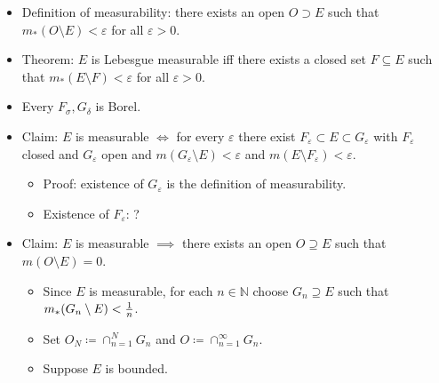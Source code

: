 
\begin{solution}

\hfill

\begin{concept}

\hfill

\begin{itemize}
\tightlist
\item
  Definition of measurability: there exists an open \(O\supset E\) such
  that \(m_*(O\setminus E) < \varepsilon\) for all \(\varepsilon> 0\).
\item
  Theorem: \(E\) is Lebesgue measurable iff there exists a closed set
  \(F\subseteq E\) such that \(m_*(E\setminus F) < \varepsilon\) for all
  \(\varepsilon>0\).
\item
  Every \(F_\sigma, G_\delta\) is Borel.
\item
  Claim: \(E\) is measurable \(\iff\) for every \(\varepsilon\) there
  exist \(F_\varepsilon \subset E \subset G_\varepsilon\) with
  \(F_\varepsilon\) closed and \(G_\varepsilon\) open and
  \(m(G_\varepsilon \setminus E)< \varepsilon\) and
  \(m(E\setminus F_\varepsilon) < \varepsilon\).

  \begin{itemize}
  \tightlist
  \item
    Proof: existence of \(G_\varepsilon\) is the definition of
    measurability.
  \item
    Existence of \(F_\varepsilon\): ?
  \end{itemize}
\item
  Claim: \(E\) is measurable \(\implies\) there exists an open
  \(O\supseteq E\) such that \(m(O\setminus E) = 0\).

  \begin{itemize}
  \tightlist
  \item
    Since \(E\) is measurable, for each \(n\in {\mathbb{N}}\) choose
    \(G_n \supseteq E\) such that \(m_*(G_n\setminus E) < {1\over n}\).
  \item
    Set \(O_N \coloneqq\cap_{n=1}^N G_n\) and
    \(O\coloneqq\cap_{n=1}^\infty G_n\).
  \item
    Suppose \(E\) is bounded.


\end{itemize}
\end{itemize}
\end{concept}
\end{solution}
